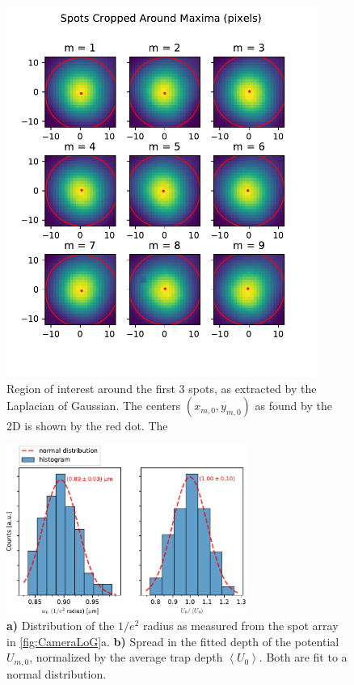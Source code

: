 \begin{figure}
    \centering
    \includegraphics[width=0.9\textwidth]{figures/SpotsCropped_range12.pdf}
    \caption{Region of interest around the first 3 spots, as extracted by the Laplacian of Gaussian. 
    The centers $(x_{m,0},y_{m,0})$ as found by the 2D is shown by the red dot. 
    The }
    \label{fig:SpotsRoI}
\end{figure}

\begin{figure}
    \centering
    \includegraphics[width=0.7\textwidth]{figures/FittedHistograms.pdf}
    \caption{\textbf{a)} Distribution of the $1/e^2$ radius as measured from the spot array in \cref{fig:CameraLoG}a.
    \textbf{b)} Spread in the fitted depth of the potential $U_{m,0}$, normalized by the average trap depth $\left\langle U_0 \right\rangle$.
    Both are fit to a normal distribution.
    }
    \label{fig:Histograms}
\end{figure}

